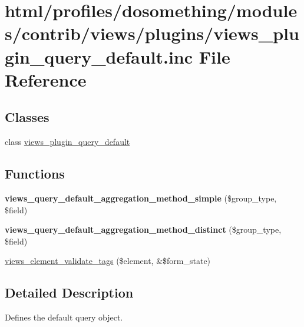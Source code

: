 \hypertarget{views__plugin__query__default_8inc}{
\section{html/profiles/dosomething/modules/contrib/views/plugins/views\_\-plugin\_\-query\_\-default.inc File Reference}
\label{views__plugin__query__default_8inc}
}
\subsection*{Classes}
\begin{DoxyCompactItemize}
\item 
class \hyperlink{classviews__plugin__query__default}{views\_\-plugin\_\-query\_\-default}
\end{DoxyCompactItemize}
\subsection*{Functions}
\begin{DoxyCompactItemize}
\item 
\hypertarget{views__plugin__query__default_8inc_a8588bb1d20da0160c830cb61f384926d}{
{\bfseries views\_\-query\_\-default\_\-aggregation\_\-method\_\-simple} (\$group\_\-type, \$field)}
\label{views__plugin__query__default_8inc_a8588bb1d20da0160c830cb61f384926d}

\item 
\hypertarget{views__plugin__query__default_8inc_a7a2cec62d9319d8eda5808ecc4eaa70d}{
{\bfseries views\_\-query\_\-default\_\-aggregation\_\-method\_\-distinct} (\$group\_\-type, \$field)}
\label{views__plugin__query__default_8inc_a7a2cec62d9319d8eda5808ecc4eaa70d}

\item 
\hyperlink{views__plugin__query__default_8inc_a171eb458045ffb67300a100fcef09015}{views\_\-element\_\-validate\_\-tags} (\$element, \&\$form\_\-state)
\end{DoxyCompactItemize}


\subsection{Detailed Description}
Defines the default query object. 


